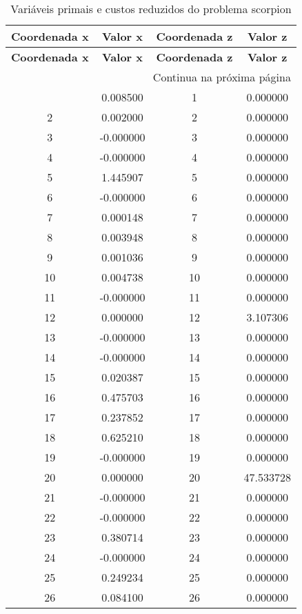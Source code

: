 \documentclass[12pt]{article}
\begin{document}
\begin{longtable}{@{}cccc@{}}
\caption{Variáveis primais e custos reduzidos do problema scorpion} \\
\toprule
\textbf{Coordenada x} & \textbf{Valor x} & \textbf{Coordenada z} & \textbf{Valor z} \\
\midrule
\endfirsthead

\toprule
\textbf{Coordenada x} & \textbf{Valor x} & \textbf{Coordenada z} & \textbf{Valor z} \\
\midrule
\endhead

\midrule \multicolumn{4}{r}{{Continua na próxima página}} \\ \midrule
\endfoot

\bottomrule
\endlastfoot
1 & 0.008500 & 1 & 0.000000 \\
2 & 0.002000 & 2 & 0.000000 \\
3 & -0.000000 & 3 & 0.000000 \\
4 & -0.000000 & 4 & 0.000000 \\
5 & 1.445907 & 5 & 0.000000 \\
6 & -0.000000 & 6 & 0.000000 \\
7 & 0.000148 & 7 & 0.000000 \\
8 & 0.003948 & 8 & 0.000000 \\
9 & 0.001036 & 9 & 0.000000 \\
10 & 0.004738 & 10 & 0.000000 \\
11 & -0.000000 & 11 & 0.000000 \\
12 & 0.000000 & 12 & 3.107306 \\
13 & -0.000000 & 13 & 0.000000 \\
14 & -0.000000 & 14 & 0.000000 \\
15 & 0.020387 & 15 & 0.000000 \\
16 & 0.475703 & 16 & 0.000000 \\
17 & 0.237852 & 17 & 0.000000 \\
18 & 0.625210 & 18 & 0.000000 \\
19 & -0.000000 & 19 & 0.000000 \\
20 & 0.000000 & 20 & 47.533728 \\
21 & -0.000000 & 21 & 0.000000 \\
22 & -0.000000 & 22 & 0.000000 \\
23 & 0.380714 & 23 & 0.000000 \\
24 & -0.000000 & 24 & 0.000000 \\
25 & 0.249234 & 25 & 0.000000 \\
26 & 0.084100 & 26 & 0.000000 \\

\end{longtable}
\end{document}
